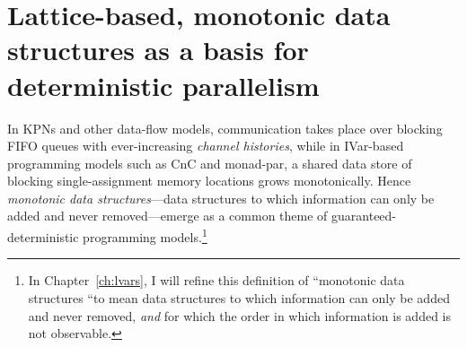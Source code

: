 \section{Lattice-based, monotonic data structures as a basis for deterministic parallelism}\label{s:intro-monotonic}

In KPNs and other data-flow models, communication takes place over
blocking FIFO queues with ever-increasing \emph{channel histories},
while in IVar-based programming models such as CnC and monad-par, a
shared data store of blocking single-assignment memory locations grows
monotonically.  Hence \emph{monotonic data structures}---data
structures to which information can only be added and never
removed---emerge as a common theme of guaranteed-deterministic
programming models.\footnote{In Chapter~\ref{ch:lvars}, I will refine
  this definition of ``monotonic data structures ``to mean data
  structures to which information can only be added and never removed,
  \emph{and} for which the order in which information is added is not
  observable.}

